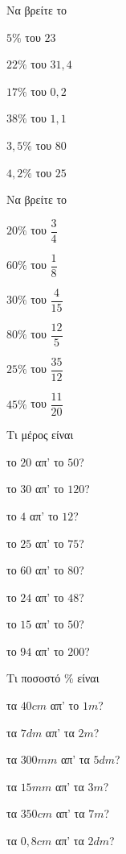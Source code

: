 \documentclass[11pt,a4paper,modern]{FFExercises}
\begin{document}
\askhsh Να βρείτε το
\begin{multicols}{2}
\begin{alist}
\item $5\%$ του $23$
\item $22\%$ του $31{,}4$
\item $17\%$ του $0{,}2$
\item $38\%$ του $1{,}1$
\item $3{,}5\%$ του $80$
\item $4{,}2\%$ του $25$
\end{alist}
\end{multicols}
\askhsh Να βρείτε το
\begin{multicols}{2}
\begin{alist}
\item $20\%$ του $\dfrac{3}{4}$
\item $60\%$ του $\dfrac{1}{8}$
\item $30\%$ του $\dfrac{4}{15}$
\item $80\%$ του $\dfrac{12}{5}$
\item $25\%$ του $\dfrac{35}{12}$
\item $45\%$ του $\dfrac{11}{20}$
\end{alist}
\end{multicols}
\askhsh Τι μέρος είναι
\begin{multicols}{2}
\begin{alist}
\item το $20$ απ' το $50$?
\item το $30$ απ' το $120$?
\item το $4$ απ' το $12$?
\item το $25$ απ' το $75$?
\item το $60$ απ' το $80$?
\item το $24$ απ' το $48$?
\item το $15$ απ' το $50$?
\item το $94$ απ' το $200$?
\end{alist}
\end{multicols}
\askhsh Τι ποσοστό $\%$ είναι
\begin{multicols}{2}
\begin{alist}[leftmargin=5mm]
\item τα $40\si{cm}$ απ' το $1\si{m}$?
\item τα $7\si{dm}$ απ' τα $2\si{m}$?
\item τα $300\si{mm}$ απ' τα $5\si{dm}$?
\item τα $15\si{mm}$ απ' τα $3\si{m}$?
\item τα $350\si{cm}$ απ' τα $7\si{m}$?
\item τα $0{,}8\si{cm}$ απ' τα $2\si{dm}$?
\end{alist}
\end{multicols}
\end{document}
